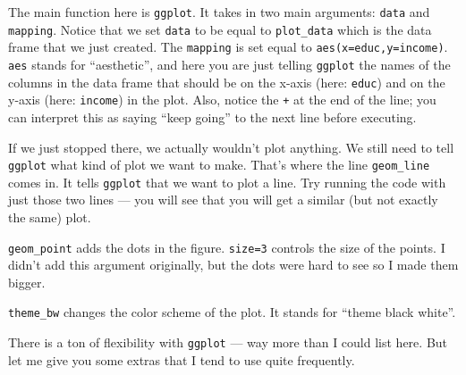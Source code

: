 \documentclass[
  letterpaper,
  DIV=11,
  numbers=noendperiod]{scrreprt}
\begin{document}
The main function here is \texttt{ggplot}. It takes in two main
arguments: \texttt{data} and \texttt{mapping}. Notice that we set
\texttt{data} to be equal to \texttt{plot\_data} which is the data frame
that we just created. The \texttt{mapping} is set equal to
\texttt{aes(x=educ,y=income)}. \texttt{aes} stands for ``aesthetic'',
and here you are just telling \texttt{ggplot} the names of the columns
in the data frame that should be on the x-axis (here: \texttt{educ}) and
on the y-axis (here: \texttt{income}) in the plot. Also, notice the
\texttt{+} at the end of the line; you can interpret this as saying
``keep going'' to the next line before executing.

If we just stopped there, we actually wouldn't plot anything. We still
need to tell \texttt{ggplot} what kind of plot we want to make. That's
where the line \texttt{geom\_line} comes in. It tells \texttt{ggplot}
that we want to plot a line. Try running the code with just those two
lines --- you will see that you will get a similar (but not exactly the
same) plot.

\texttt{geom\_point} adds the dots in the figure. \texttt{size=3}
controls the size of the points. I didn't add this argument originally,
but the dots were hard to see so I made them bigger.

\texttt{theme\_bw} changes the color scheme of the plot. It stands for
``theme black white''.

There is a ton of flexibility with \texttt{ggplot} --- way more than I
could list here. But let me give you some extras that I tend to use
quite frequently.
\end{document}
